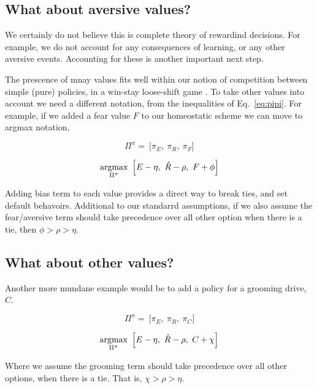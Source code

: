 \subsection*{What about aversive values?}
We certainly do not believe this is complete theory of rewardind decisions. For example, we do not account for any consequences of learning, or any other aversive events. Accounting for these is another important next step.

The prescence of mnay values fits well within our notion of competition between simple (pure) policies, in a win-stay loose-shift game \cite{Estes1994TowardAS}. To take other values into account we need a different notation, from the inequalities of Eq.~\ref{eq:pipi}. For example, if we added a fear value $F$ to our homeostatic scheme we can move to argmax notation,

\begin{equation}
\label{eq:pipi_f} 
\Pi^{\pi} = \ \Big [ \pi_E,\ \pi_R,\ \pi_F \Big ]
\end{equation}

\begin{equation}
\label{eq:meta_greedy_f} 
	\operatorname*{argmax}_{\Pi^{\pi}} \ \Big [ E - \eta,\ \hat R - \rho,\ F + \phi \Big ]
\end{equation}

Adding bias term to each value provides a direct way to break ties, and set default behavoirs. Additional to our standarrd assumptions, if we also assume the fear/aversive term should take precedence over all other option when there is a tie, then $\phi > \rho > \eta$.

\subsection*{What about other values?}
Another more mundane example would be to add a policy for a grooming drive, $C$. 

\begin{equation}
\label{eq:pipi_c} 
\Pi^{\pi} = \ \Big [ \pi_E,\ \pi_R,\ \pi_C \Big ]
\end{equation}

\begin{equation}
\label{eq:meta_greedy_c} 
\operatorname*{argmax}_{\Pi^{\pi}} \ \Big [ E - \eta,\ \hat R - \rho,\ C + \chi \Big ]
\end{equation}

Where we assume the grooming term should take precedence over all other options, when there is a tie. That is, $\chi > \rho > \eta$.

